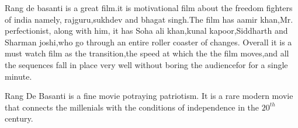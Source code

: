 \documentclass{article}
\author{raj kumar meena}
\begin{document}
Rang de basanti is a great film.it is motivational film about the freedom fighters of india namely, rajguru,sukhdev and bhagat singh.The film has aamir khan,Mr. perfectionist, along with him, it has Soha ali khan,kunal kapoor,Siddharth and Sharman joshi,who go through an entire roller coaster of changes.
Overall it is a must watch film as the transition,the speed at which the the film moves,and all the sequences fall in place very well without boring the audiencefor for a single minute.

Rang De Basanti is a fine movie potraying patriotism. It is a rare modern movie that connects the millenials with the conditions of independence in the 
$20^{th}$ century.
\end{document}
